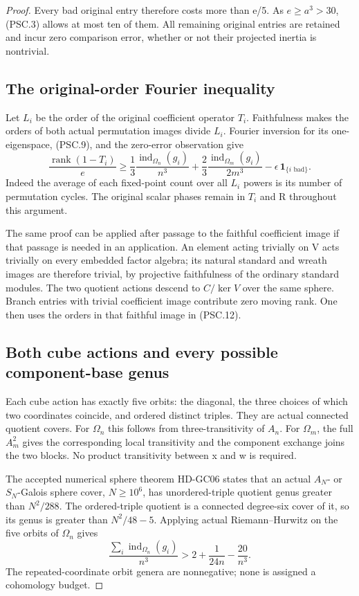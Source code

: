 \begin{proof}
Every bad original entry therefore costs more than e/5.
As \(e\ge a^3>30\), (PSC.3) allows at most ten of them.
All remaining original entries are retained and incur zero
comparison error, whether or not their projected inertia is
nontrivial.

\subsection*{The original-order Fourier inequality}

Let \(L_i\) be the order of the original coefficient operator
\(T_i\).  Faithfulness makes the orders of both actual
permutation images divide \(L_i\).  Fourier inversion for
its one-eigenspace, (PSC.9), and the zero-error observation give
\[
 \frac{\operatorname{rank}(1-T_i)}e
 \ge\frac13\frac{\operatorname{ind}_{\Omega_n}(g_i)}{n^3}
     +\frac23\frac{\operatorname{ind}_{\Omega_m}(g_i)}{2m^3}
                       -\epsilon\,\mathbf1_{\{i\text{ bad}\}}.
 \tag{PSC.12}
\]
Indeed the average of each fixed-point count over all \(L_i\)
powers is its number of permutation cycles.  The original
scalar phases remain in \(T_i\) and R throughout this argument.

The same proof can be applied after passage to the faithful
coefficient image if that passage is needed in an application.
An element acting trivially on V acts trivially on every
embedded factor algebra; its natural standard and wreath
images are therefore trivial, by projective faithfulness of
the ordinary standard modules.  The two quotient actions
descend to \(C/\ker V\) over the same sphere.  Branch entries
with trivial coefficient image contribute zero moving rank.
One then uses the orders in that faithful image in (PSC.12).

\subsection*{Both cube actions and every possible component-base genus}

Each cube action has exactly five orbits: the diagonal, the
three choices of which two coordinates coincide, and ordered
distinct triples.  They are actual connected quotient covers.
For \(\Omega_n\) this follows from three-transitivity of
\(A_n\).  For \(\Omega_m\), the full \(A_m^2\) gives the
corresponding local transitivity and the component exchange
joins the two blocks.  No product transitivity between x and w
is required.

The accepted numerical sphere theorem HD-GC06 states that an
actual \(A_N\)- or \(S_N\)-Galois sphere cover, \(N\ge10^6\),
has unordered-triple quotient genus greater than \(N^2/288\).
The ordered-triple quotient is a connected degree-six cover
of it, so its genus is greater than \(N^2/48-5\).
Applying actual Riemann--Hurwitz on the five orbits of
\(\Omega_n\) gives
\[
 \frac{\sum_i\operatorname{ind}_{\Omega_n}(g_i)}{n^3}
                 >2+\frac1{24n}-\frac{20}{n^3}.
 \tag{PSC.13}
\]
The repeated-coordinate orbit genera are nonnegative; none is
assigned a cohomology budget.


\end{proof}
